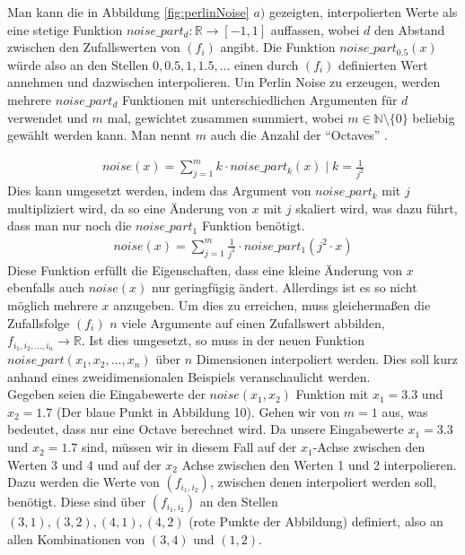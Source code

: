 \documentclass[11pt,a4paper]{article}
\begin{document}
\noindent
Man kann die in Abbildung \ref{fig:perlinNoise} $a)$ gezeigten, interpolierten Werte als eine stetige Funktion $noise\_part_d\colon \mathbb{R} \rightarrow [-1, 1]$ auffassen, wobei $d$ den Abstand zwischen den Zufallswerten von $(f_i)$ angibt. Die Funktion $noise\_part_{0.5}(x)$ würde also an den Stellen $0, 0.5, 1, 1.5, ...$ einen durch $(f_i)$ definierten Wert annehmen und dazwischen interpolieren. Um Perlin Noise zu erzeugen, werden mehrere $noise\_part_d$ Funktionen mit unterschiedlichen Argumenten für $d$ verwendet und $m$ mal, gewichtet zusammen summiert, wobei $m \in \mathbb{N}\setminus\{0\}$ beliebig gewählt werden kann. Man nennt $m$ auch die Anzahl der ``Octaves'' \cite[Kap. Introduction]{nature_of_code}.

\begin{align}
noise(x) = \sum^{m}_{j=1} k \cdot noise\_part_{k}(x) \mid k = \frac{1}{j^2}
\end{align}
\noindent
Dies kann umgesetzt werden, indem das Argument von $noise\_part_k$ mit $j$ multipliziert wird, da so eine Änderung von $x$ mit $j$ skaliert wird, was dazu führt, dass man nur noch die $noise\_part_1$ Funktion benötigt.
\begin{align}
noise(x) = \sum^{m}_{j=1}  \frac{1}{j^2} \cdot noise\_part_1(j^2 \cdot x)
\end{align}
\noindent
Diese Funktion erfüllt die Eigenschaften, dass eine kleine Änderung von $x$ ebenfalls auch $noise(x)$ nur geringfügig ändert. Allerdings ist es so nicht möglich mehrere $x$ anzugeben. Um dies zu erreichen, muss gleichermaßen die Zufallsfolge $(f_i)$ $n$ viele Argumente auf einen Zufallswert abbilden, $f_{i_1, i_2, ..., i_n} \rightarrow \mathbb{R}$. Ist dies umgesetzt, so muss in der neuen Funktion $noise\_part(x_1, x_2, ..., x_n)$ über $n$ Dimensionen interpoliert werden. Dies soll kurz anhand eines zweidimensionalen Beispiels veranschaulicht werden.\\
Gegeben seien die Eingabewerte der $noise(x_1, x_2)$ Funktion mit $x_1=3.3$ und $x_2 = 1.7$ (Der blaue Punkt in Abbildung 10). Gehen wir von $m = 1$ aus, was bedeutet, dass nur eine Octave berechnet wird. Da unsere Eingabewerte $x_1 = 3.3$ und $x_2 = 1.7$ sind, müssen wir in diesem Fall auf der $x_1$-Achse zwischen den Werten 3 und 4 und auf der $x_2$ Achse zwischen den Werten 1 und 2 interpolieren. Dazu werden die Werte von $(f_{i_1, i_2})$, zwischen denen interpoliert werden soll, benötigt. Diese sind über $(f_{i_1, i_2})$ an den Stellen $(3, 1), (3, 2), (4, 1), (4, 2)$ (rote Punkte der Abbildung) definiert, also an allen Kombinationen von $(3,4)$ und $(1,2)$.\\
\end{document}
